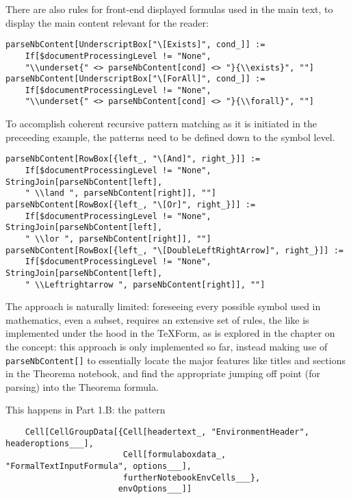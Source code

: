 There are also rules for front-end displayed formulas used in the main text, to display the main content relevant for the reader:

\begin{verbatim}
parseNbContent[UnderscriptBox["\[Exists]", cond_]] :=
    If[$documentProcessingLevel != "None", 
    "\\underset{" <> parseNbContent[cond] <> "}{\\exists}", ""]
parseNbContent[UnderscriptBox["\[ForAll]", cond_]] :=
    If[$documentProcessingLevel != "None", 
    "\\underset{" <> parseNbContent[cond] <> "}{\\forall}", ""]
\end{verbatim}

To accomplish coherent recursive pattern matching as it is initiated in the preceeding example, the patterns need to be defined down to the symbol level.

\begin{verbatim}
parseNbContent[RowBox[{left_, "\[And]", right_}]] := 
    If[$documentProcessingLevel != "None", StringJoin[parseNbContent[left], 
    " \\land ", parseNbContent[right]], ""]
parseNbContent[RowBox[{left_, "\[Or]", right_}]] := 
    If[$documentProcessingLevel != "None", StringJoin[parseNbContent[left], 
    " \\lor ", parseNbContent[right]], ""]
parseNbContent[RowBox[{left_, "\[DoubleLeftRightArrow]", right_}]] := 
    If[$documentProcessingLevel != "None", StringJoin[parseNbContent[left], 
    " \\Leftrightarrow ", parseNbContent[right]], ""]
\end{verbatim}

The approach is naturally limited: foreseeing every possible symbol used in mathematics, even a subset, requires an extensive set of rules, the like is implemented under the hood in the TeXForm, as is explored in the chapter on the concept: this approach is only implemented so far, instead making use of \lstinline+parseNbContent[]+ to essentially locate the major features like titles and sections in the Theorema notebook, and find the appropriate jumping off point (for parsing) into the Theorema formula.

This happens in Part 1.B: the pattern

\begin{verbatim}
    Cell[CellGroupData[{Cell[headertext_, "EnvironmentHeader", headeroptions___], 
                        Cell[formulaboxdata_, "FormalTextInputFormula", options___], 
                        furtherNotebookEnvCells___}, 
                       envOptions___]]
\end{verbatim}

